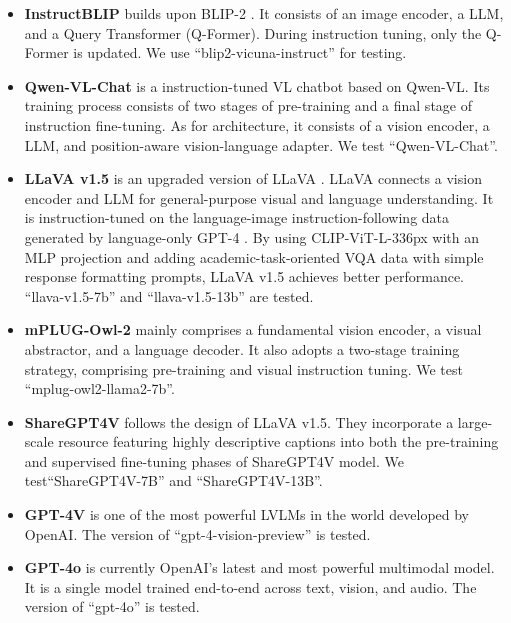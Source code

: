 \begin{itemize}
    \item \textbf{InstructBLIP} \cite{dai2023instructblip} builds upon BLIP-2 \cite{li2023blip}. 
    It consists of an image encoder, a LLM, and a Query Transformer (Q-Former). 
    During instruction tuning, only the Q-Former is updated. 
    We use ``blip2-vicuna-instruct'' for testing.
    \item \textbf{Qwen-VL-Chat} \cite{bai2023qwenvl} is a instruction-tuned VL chatbot based on Qwen-VL. 
    Its training process consists of two stages of pre-training and a final stage of instruction fine-tuning. 
    As for architecture, it consists of a vision encoder, a LLM, and position-aware vision-language adapter. We test ``Qwen-VL-Chat''.
    \item \textbf{LLaVA v1.5} \citep{liu2023improved} is an upgraded version of LLaVA  \cite{liu2023llava}. 
    LLaVA connects a vision encoder and LLM for general-purpose visual and language understanding. 
    It is instruction-tuned on the language-image instruction-following data generated by language-only GPT-4 \cite{openai2023gpt4}. 
    By using CLIP-ViT-L-336px with an MLP projection and adding academic-task-oriented VQA data with simple response formatting prompts, LLaVA v1.5 achieves better performance. 
    ``llava-v1.5-7b'' and ``llava-v1.5-13b'' are tested.
    \item \textbf{mPLUG-Owl-2} \cite{ye2023mplug} mainly comprises a fundamental vision encoder, a visual abstractor, and a language decoder. 
    It also adopts a two-stage training strategy, comprising pre-training and visual instruction tuning. 
    We test ``mplug-owl2-llama2-7b''. 
    \item \textbf{ShareGPT4V} \cite{chen2023sharegpt4v} follows the design of LLaVA v1.5.
     They incorporate a large-scale resource featuring highly descriptive captions into both the pre-training and supervised fine-tuning phases of ShareGPT4V model.
    We test``ShareGPT4V-7B'' and ``ShareGPT4V-13B''.
    \item \textbf{GPT-4V} \citep{openai2023gpt4} is one of the most powerful LVLMs in the world developed by OpenAI. The version of ``gpt-4-vision-preview'' is tested.
    \item \textbf{GPT-4o} \citep{openai2023gpt4} is currently OpenAI's latest and most powerful multimodal model. It is a single model trained end-to-end across text, vision, and audio. The version of ``gpt-4o'' is tested.
\end{itemize}

